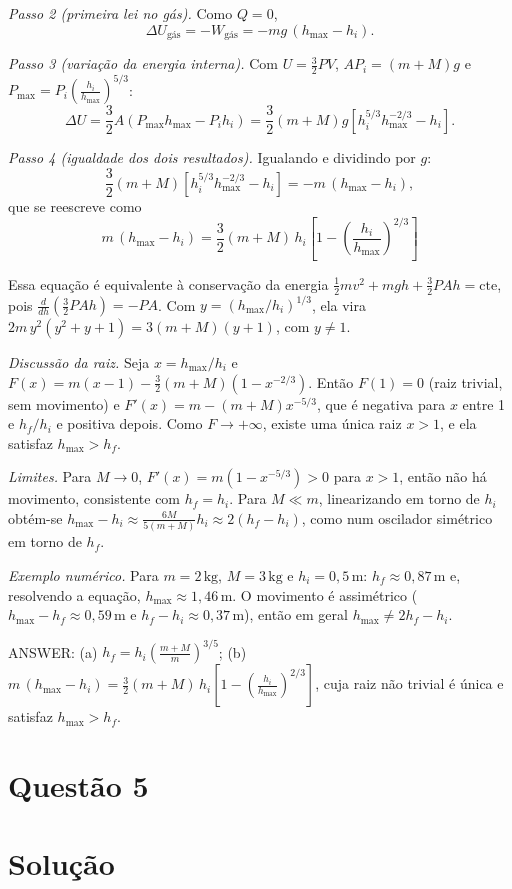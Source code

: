\documentclass{article}%
\begin{document}
\textit{Passo 2 (primeira lei no gás).} Como $Q=0$,
\[
\Delta U_{\text{gás}}=-W_{\text{gás}}=-mg\,(h_{\max}-h_i).
\]

\textit{Passo 3 (variação da energia interna).} Com $U=\frac{3}{2}PV$, $AP_i=(m+M)g$ e $P_{\max}=P_i\left(\frac{h_i}{h_{\max}}\right)^{5/3}$:
\[
\Delta U=\frac{3}{2}A\left(P_{\max}h_{\max}-P_ih_i\right)=\frac{3}{2}(m+M)g\left[h_i^{5/3}h_{\max}^{-2/3}-h_i\right].
\]

\textit{Passo 4 (igualdade dos dois resultados).} Igualando e dividindo por $g$:
\[
\frac{3}{2}(m+M)\left[h_i^{5/3}h_{\max}^{-2/3}-h_i\right]=-m\,(h_{\max}-h_i),
\]
que se reescreve como
\[
\boxed{\,m\,(h_{\max}-h_i)=\frac{3}{2}(m+M)\,h_i\left[1-\left(\frac{h_i}{h_{\max}}\right)^{2/3}\right]\,}
\]

Essa equação é equivalente à conservação da energia $\frac{1}{2}mv^2+mgh+\frac{3}{2}PAh=\text{cte}$, pois $\frac{d}{dh}\left(\frac{3}{2}PAh\right)=-PA$. Com $y=(h_{\max}/h_i)^{1/3}$, ela vira $2m\,y^2(y^2+y+1)=3(m+M)(y+1)$, com $y\neq 1$.

\textit{Discussão da raiz.} Seja $x=h_{\max}/h_i$ e $F(x)=m(x-1)-\frac{3}{2}(m+M)\left(1-x^{-2/3}\right)$. Então $F(1)=0$ (raiz trivial, sem movimento) e $F'(x)=m-(m+M)x^{-5/3}$, que é negativa para $x$ entre 1 e $h_f/h_i$ e positiva depois. Como $F\to+\infty$, existe uma única raiz $x>1$, e ela satisfaz $h_{\max}>h_f$.

\textit{Limites.} Para $M\to 0$, $F'(x)=m(1-x^{-5/3})>0$ para $x>1$, então não há movimento, consistente com $h_f=h_i$. Para $M\ll m$, linearizando em torno de $h_i$ obtém-se $h_{\max}-h_i\approx\frac{6M}{5(m+M)}h_i\approx 2(h_f-h_i)$, como num oscilador simétrico em torno de $h_f$.

\textit{Exemplo numérico.} Para $m=2\,\text{kg}$, $M=3\,\text{kg}$ e $h_i=0,5\,\text{m}$: $h_f\approx 0,87\,\text{m}$ e, resolvendo a equação, $h_{\max}\approx 1,46\,\text{m}$. O movimento é assimétrico ($h_{\max}-h_f\approx 0,59\,\text{m}$ e $h_f-h_i\approx 0,37\,\text{m}$), então em geral $h_{\max}\neq 2h_f-h_i$.

ANSWER: (a) $h_f=h_i\left(\frac{m+M}{m}\right)^{3/5}$; (b) $m\,(h_{\max}-h_i)=\frac{3}{2}(m+M)\,h_i\left[1-\left(\frac{h_i}{h_{\max}}\right)^{2/3}\right]$, cuja raiz não trivial é única e satisfaz $h_{\max}>h_f$.%
\newpage%
\section*{Questão 5}

\section*{Solução}
\end{document}
